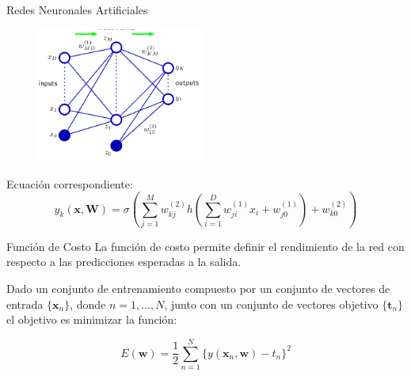 \documentclass[10pt]{beamer}
\begin{document}
\begin{frame}{Redes Neuronales Artificiales}
    \begin{figure}[!h] 
        \centering
        \includegraphics[width=0.50\textwidth]{../img/reddoscapas}
        \label{fig:reddoscapas}
    \end{figure}
    Ecuación correspondiente:
    \begin{equation}\label{eq:reddoscapas}
        y_k(\mathbf{x}, \mathbf{W}) = \sigma \left( \sum_{j=1}^M w_{kj}^{(2)} h \left( \sum_{i=1}^D w_{ji}^{(1)} x_i + w_{j0}^{(1)} \right) + w_{k0}^{(2)} \right)
    \end{equation}
\end{frame}

\begin{frame}{Función de Costo}
    La función de costo permite definir el rendimiento de la red con respecto a las predicciones esperadas a la salida.

    Dado un conjunto de entrenamiento compuesto por un conjunto de vectores 
        de entrada $\{\mathbf{x}_n \}$, donde $n = 1, \ldots , N$, junto con un conjunto de vectores objetivo $\{\mathbf{t}_n \}$
        el objetivo es \alert{minimizar la función}:

        \begin{equation}\label{eq:error}
            E(\mathbf{w}) = \frac{1}{2} \sum_{n=1}^N \{y(\mathbf{x}_n, \mathbf{w}) - t_n\}^2
        \end{equation}

\end{frame}
\end{document}
